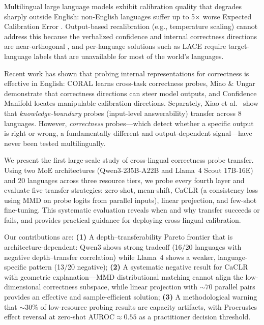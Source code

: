\documentclass[11pt,a4paper]{article}
\newcommand{\auroc}{AUROC}
\begin{document}
Multilingual large language models exhibit calibration quality that degrades sharply outside English: non-English languages suffer up to 5$\times$ worse Expected Calibration Error \cite{joshi2024llm}. Output-based recalibration (e.g., temperature scaling) cannot address this because the verbalized confidence and internal correctness directions are near-orthogonal \cite{miao2026steering}, and per-language solutions such as LACE \cite{zhou2024lace} require target-language labels that are unavailable for most of the world's languages.

Recent work has shown that probing internal representations for correctness is effective in English: CORAL \cite{miao2026coral} learns cross-task correctness probes, Miao \& Ungar \citeyearpar{miao2026steering} demonstrate that correctness directions can steer model outputs, and Confidence Manifold \cite{ji2024llm} locates manipulable calibration directions. Separately, Xiao et al.\ \citeyearpar{xiao2025knowledge} show that \emph{knowledge-boundary} probes (input-level answerability) transfer across 8 languages. However, \emph{correctness} probes---which detect whether a specific output is right or wrong, a fundamentally different and output-dependent signal---have never been tested multilingually.

We present the first large-scale study of cross-lingual correctness probe transfer. Using two MoE architectures (Qwen3-235B-A22B and Llama~4 Scout 17B-16E) and 20 languages across three resource tiers, we probe every fourth layer and evaluate five transfer strategies: zero-shot, mean-shift, CaCLR (a consistency loss using MMD on probe logits from parallel inputs), linear projection, and few-shot fine-tuning. This systematic evaluation reveals when and why transfer succeeds or fails, and provides practical guidance for deploying cross-lingual calibration.

Our contributions are:
\textbf{(1)} A depth--transferability Pareto frontier that is architecture-dependent: Qwen3 shows strong tradeoff (16/20 languages with negative depth--transfer correlation) while Llama~4 shows a weaker, language-specific pattern (13/20 negative);
\textbf{(2)} A systematic negative result for CaCLR with geometric explanation---MMD distributional matching cannot align the low-dimensional correctness subspace, while linear projection with ${\sim}70$ parallel pairs provides an effective and sample-efficient solution;
\textbf{(3)} A methodological warning that ${\sim}30\%$ of low-resource probing results are capacity artifacts, with Procrustes effect reversal at zero-shot \auroc{}$\approx 0.55$ as a practitioner decision threshold.
\end{document}
